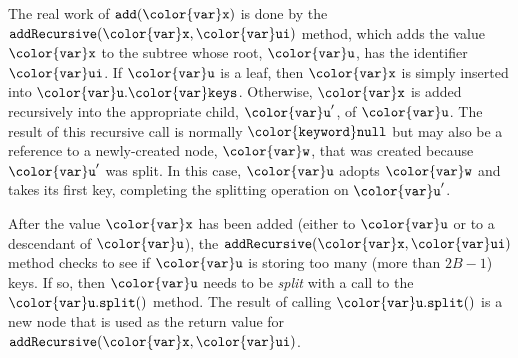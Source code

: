 \documentclass[10pt]{book}
\theoremstyle{plain}
\theoremstyle{definition}
\begin{document}
The real work of \ensuremath{\mathtt{add({\color{var}x})}} is done by the \ensuremath{\mathtt{addRecursive({\color{var}x},{\color{var}ui})}} method,
which adds the value \ensuremath{\mathtt{{\color{var}x}}} to the subtree whose root, \ensuremath{\mathtt{{\color{var}u}}}, has the
identifier \ensuremath{\mathtt{{\color{var}ui}}}.  If \ensuremath{\mathtt{{\color{var}u}}} is a leaf, then \ensuremath{\mathtt{{\color{var}x}}} is simply inserted into
\ensuremath{\mathtt{{\color{var}u}.{\color{var}keys}}}.  Otherwise, \ensuremath{\mathtt{{\color{var}x}}} is added recursively into the appropriate
child, $\ensuremath{\mathtt{{\color{var}u}}}'$, of \ensuremath{\mathtt{{\color{var}u}}}.  The result of this recursive call is normally
\ensuremath{\mathtt{{\color{keyword}null}}} but may also be a reference to a newly-created node, \ensuremath{\mathtt{{\color{var}w}}}, that
was created because $\ensuremath{\mathtt{{\color{var}u}}}'$ was split.  In this case, \ensuremath{\mathtt{{\color{var}u}}} adopts \ensuremath{\mathtt{{\color{var}w}}}
and takes its first key, completing the splitting operation on $\ensuremath{\mathtt{{\color{var}u}}}'$.

After the value \ensuremath{\mathtt{{\color{var}x}}} has been added (either to \ensuremath{\mathtt{{\color{var}u}}} or to a descendant of \ensuremath{\mathtt{{\color{var}u}}}),
the \ensuremath{\mathtt{addRecursive({\color{var}x},{\color{var}ui})}} method checks to see if \ensuremath{\mathtt{{\color{var}u}}} is storing too many
(more than $2B-1$) keys.  If so, then \ensuremath{\mathtt{{\color{var}u}}} needs to be \emph{split}
with a call to the \ensuremath{\mathtt{{\color{var}u}.split()}} method.  The result of calling \ensuremath{\mathtt{{\color{var}u}.split()}}
is a new node that is used as the return value for \ensuremath{\mathtt{addRecursive({\color{var}x},{\color{var}ui})}}.
\end{document}
